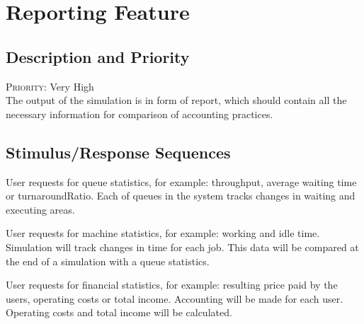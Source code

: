 \section{Reporting Feature} \label{s:system-features:reporting-feature}
	\begin{comment}
		$<$Don’t really say “System Feature 1.” State the feature name in just a few 
		words.$>$
	\end{comment}

\subsection*{Description and Priority}
	\begin{comment}
		$<$Provide a short description of the feature and indicate whether it is of 
		High, Medium, or Low priority. You could also include specific priority 
		component ratings, such as benefit, penalty, cost, and risk (each rated on a 
		relative scale from a low of 1 to a high of 9).$>$
	\end{comment}
	\textsc{Priority: } Very High \\
	The output of the simulation is in form of report, which should contain all the necessary information for comparison of accounting practices.
	
\subsection*{Stimulus/Response Sequences}
	\begin{comment}
		$<$List the sequences of user actions and system responses that stimulate the 
		behavior defined for this feature. These will correspond to the dialog elements 
		associated with use cases.$>$
	\end{comment}

	\stimresp
	{User requests for queue statistics, for example: \gls{throughput}, average waiting time or \gls{turnaroundRatio}.}
	{Each of queues in the system tracks changes in waiting and executing areas.}
	
	\medskip
	
	\stimresp
	{User requests for machine statistics, for example: working and idle time.}
	{Simulation will track changes in time for each job. This data will be compared at the end of a simulation with a queue statistics.}
	
	\medskip
	
	\stimresp
	{User requests for financial statistics, for example: resulting price paid by the users, operating costs or total income.}
	{Accounting will be made for each user. Operating costs and total income will be calculated.}
